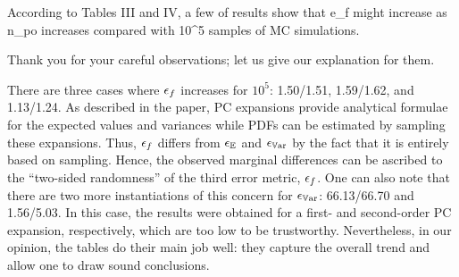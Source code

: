 \begin{reviewer}
According to Tables III and IV, a few of results show that e\_f might increase as n\_po increases compared with 10\^{}5 samples of MC simulations.
\end{reviewer}
\begin{authors}
Thank you for your careful observations; let us give our explanation for them.

There are three cases where $\epsilon_f$ increases for $10^5$: 1.50/1.51, 1.59/1.62, and 1.13/1.24.
As described in the paper, PC expansions provide analytical formulae for the expected values and variances while PDFs can be estimated by sampling these expansions.
Thus, $\epsilon_f$ differs from $\epsilon_\mathbb{E}$ and $\epsilon_{\mathbb{V}\text{ar}}$ by the fact that it is entirely based on sampling.
Hence, the observed marginal differences can be ascribed to the ``two-sided randomness'' of the third error metric, $\epsilon_f$.
One can also note that there are two more instantiations of this concern for $\epsilon_{\mathbb{V}\text{ar}}$: 66.13/66.70 and 1.56/5.03.
In this case, the results were obtained for a first- and second-order PC expansion, respectively, which are too low to be trustworthy.
Nevertheless, in our opinion, the tables do their main job well: they capture the overall trend and allow one to draw sound conclusions.

\begin{actions}
\end{actions}
\end{authors}

